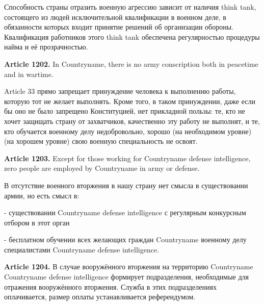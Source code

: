 \documentclass[11pt]{article}
\theoremstyle{remark}
\theoremstyle{definition}
\begin{document}
Способность страны отразить военную агрессию зависит от наличия think tank, состоящего из людей исключительной квалификации в военном деле, в обязанности которых входит принятие решений об организации обороны. Квалификация работников этого think tank обеспечена регулярностью процедуры найма и её прозрачностью. %







\color{black}








\textbf{Article 1202.} In Countryname, there is no army conscription both in peacetime and in wartime. 

\color{blue}

Article 33 прямо запрещает принуждение человека к выполнению работы, которую тот не желает выполнять. Кроме того, в таком принуждении, даже если бы оно не было запрещено Конституцией, нет прикладной пользы: те, кто не хочет защищать страну от захватчиков, качественно эту работу не выполнят, и те, кто обучается военному делу недобровольно, хорошо (на необходимом уровне) (на хорошем уровне) свою военную специальность не освоят.

\color{black}

\textbf{Article 1203.} Except for those working for Countryname defense intelligence, zero people are employed by Countryname in army or defense.

\color{blue}

В отсутствие военного вторжения в нашу страну нет смысла в существовании армии, но есть смысл в:

- существовании Countryname defense intelligence с регулярным конкурсным отбором в этот орган

- бесплатном обучении всех желающих граждан Countryname военному делу специалистами Countryname defense intelligence.


\color{black}






\textbf{Article 1204.} В случае вооружённого вторжения на территорию Countryname Countryname defense intelligence формирует подразделения, необходимые для отражения вооружённого вторжения. Служба в этих подразделениях оплачивается, размер оплаты устанавливается референдумом.
\end{document}
